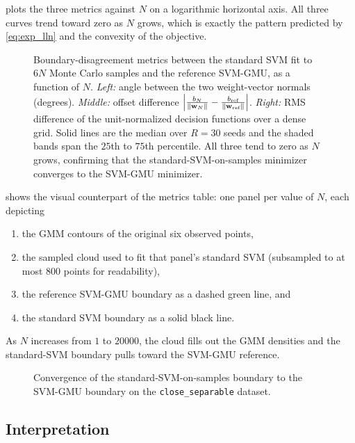 \documentclass[11pt, letterpaper]{article}
\begin{document}
 plots the three metrics against $N$ on a logarithmic horizontal axis. All three curves trend toward zero as $N$ grows, which is exactly the pattern predicted by \cref{eq:exp_lln} and the convexity of the objective.

\begin{figure}[H]
    \centering
    \resizebox{\textwidth}{!}{}
    \caption{Boundary-disagreement metrics between the standard SVM fit to $6N$ Monte Carlo samples and the reference SVM-GMU, as a function of $N$. \emph{Left:} angle between the two weight-vector normals (degrees). \emph{Middle:} offset difference $\left|\frac{b_N}{\|\vb{w}_N\|} - \frac{b_{\text{ref}}}{\|\vb{w}_{\text{ref}}\|}\right|$. \emph{Right:} RMS difference of the unit-normalized decision functions over a dense grid. Solid lines are the median over $R = 30$ seeds and the shaded bands span the $25$th to $75$th percentile. All three tend to zero as $N$ grows, confirming that the standard-SVM-on-samples minimizer converges to the SVM-GMU minimizer.}
    \label{fig:exp_conv_metrics}
\end{figure}

 shows the visual counterpart of the metrics table: one panel per value of $N$, each depicting
\begin{enumerate}
    \item the GMM contours of the original six observed points,
    \item the sampled cloud used to fit that panel's standard SVM (subsampled to at most $800$ points for readability),
    \item the reference SVM-GMU boundary as a dashed green line, and
    \item the standard SVM boundary as a solid black line.
\end{enumerate}
As $N$ increases from $1$ to $20000$, the cloud fills out the GMM densities and the standard-SVM boundary pulls toward the SVM-GMU reference.

\begin{figure}[htbp]
    \centering
    \resizebox{!}{0.93\textheight}{}
    \caption{Convergence of the standard-SVM-on-samples boundary to the SVM-GMU boundary on the \texttt{close\_separable} dataset.}
    \label{fig:exp_conv_boundaries}
\end{figure}

\subsection{Interpretation}
\end{document}

